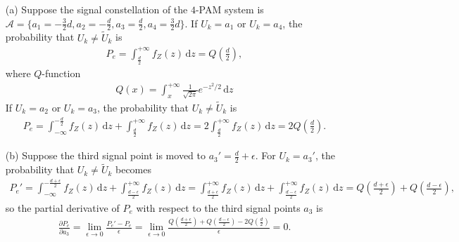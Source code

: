 \documentclass{assignment}
\begin{document}
\begin{sol}
    \begin{itemize}
        \item[(a)] Suppose the signal constellation of the $4$-PAM system is $\mathcal{A}=\{a_1=-\frac{3}{2}d,a_2=-\frac{d}{2},a_3=\frac{d}{2},a_4=\frac{3}{2}d\}$. If $U_k=a_1$ or $U_k=a_4$, the probability that $U_k\neq\tilde{U}_k$ is
        \begin{align}
            P_e=\int_{\frac{d}{2}}^{+\infty}f_Z(z)\,\mathrm{d}z=Q\left(\frac{d}{2}\right),
        \end{align}
        where $Q$-function
        \begin{align}
            Q(x)=\int_x^{+\infty}\frac{1}{\sqrt{2\pi}}e^{-z^2/2}\,\mathrm{d}z
        \end{align}
        If $U_k=a_2$ or $U_k=a_3$, the probability that $U_k\neq\tilde{U}_k$ is
        \begin{align}
            P_e=\int_{-\infty}^{-\frac{d}{2}}f_Z(z)\,\mathrm{d}z+\int_{\frac{d}{2}}^{+\infty}f_Z(z)\,\mathrm{d}z=2\int_{\frac{d}{2}}^{+\infty}f_Z(z)\,\mathrm{d}z=2Q\left(\frac{d}{2}\right).
        \end{align}
        \item[(b)] Suppose the third signal point is moved to $a_3'=\frac{d}{2}+\epsilon$. For $U_k=a_3'$, the probability that $U_k\neq\tilde{U}_k$ becomes
        \begin{align}
            P_e'=\int_{-\infty}^{-\frac{d+\epsilon}{2}}f_Z(z)\,\mathrm{d}z+\int_{\frac{d-\epsilon}{2}}^{+\infty}f_Z(z)\,\mathrm{d}z=\int_{\frac{d+\epsilon}{2}}^{+\infty}f_Z(z)\,\mathrm{d}z+\int_{\frac{d-\epsilon}{2}}^{+\infty}f_Z(z)\,\mathrm{d}z=Q\left(\frac{d+\epsilon}{2}\right)+Q\left(\frac{d-\epsilon}{2}\right),
        \end{align}
        so the partial derivative of $P_e$ with respect to the third signal points $a_3$ is
        \begin{align}
            \frac{\partial P_e}{\partial a_3}=\lim_{\epsilon\rightarrow 0}\frac{P_e'-P_e}{\epsilon}=\lim_{\epsilon\rightarrow 0}\frac{Q\left(\frac{d+\epsilon}{2}\right)+Q\left(\frac{d-\epsilon}{2}\right)-2Q\left(\frac{d}{2}\right)}{\epsilon}=0.
        \end{align}
    \end{itemize}
\end{sol}
\end{document}
